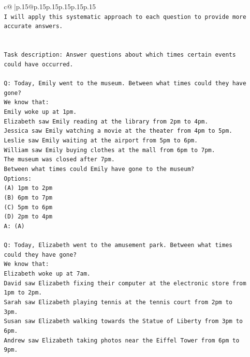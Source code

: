 \documentclass{article}
\begin{document}
{\begin{supertabular}{c@{$\;$}|p{.15\linewidth}@{}p{.15\linewidth}p{.15\linewidth}p{.15\linewidth}p{.15\linewidth}p{.15\linewidth}}
{{{\\ 
\texttt{I will apply this systematic approach to each question to provide more accurate answers.} \\
\\ 
\\ 
\texttt{Task description: Answer questions about which times certain events could have occurred.} \\
\\ 
\texttt{Q: Today, Emily went to the museum. Between what times could they have gone?} \\
\texttt{We know that:} \\
\texttt{Emily woke up at 1pm.} \\
\texttt{Elizabeth saw Emily reading at the library from 2pm to 4pm.} \\
\texttt{Jessica saw Emily watching a movie at the theater from 4pm to 5pm.} \\
\texttt{Leslie saw Emily waiting at the airport from 5pm to 6pm.} \\
\texttt{William saw Emily buying clothes at the mall from 6pm to 7pm.} \\
\texttt{The museum was closed after 7pm.} \\
\texttt{Between what times could Emily have gone to the museum?} \\
\texttt{Options:} \\
\texttt{(A) 1pm to 2pm} \\
\texttt{(B) 6pm to 7pm} \\
\texttt{(C) 5pm to 6pm} \\
\texttt{(D) 2pm to 4pm} \\
\texttt{A: (A)} \\
\\ 
\texttt{Q: Today, Elizabeth went to the amusement park. Between what times could they have gone?} \\
\texttt{We know that:} \\
\texttt{Elizabeth woke up at 7am.} \\
\texttt{David saw Elizabeth fixing their computer at the electronic store from 1pm to 2pm.} \\
\texttt{Sarah saw Elizabeth playing tennis at the tennis court from 2pm to 3pm.} \\
\texttt{Susan saw Elizabeth walking towards the Statue of Liberty from 3pm to 6pm.} \\
\texttt{Andrew saw Elizabeth taking photos near the Eiffel Tower from 6pm to 9pm.} \\
}}}
\end{supertabular}}
\end{document}
